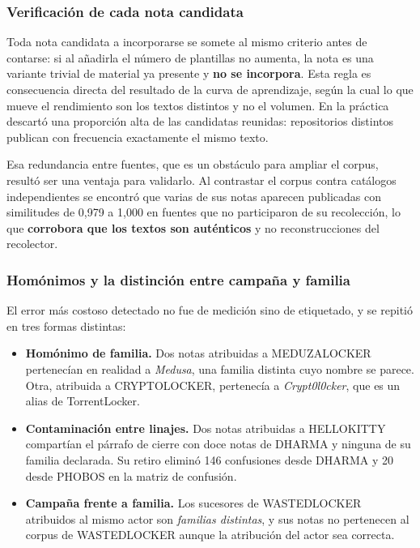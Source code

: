 \subsubsection*{Verificación de cada nota candidata}

Toda nota candidata a incorporarse se somete al mismo criterio antes de contarse: si al añadirla el número de plantillas no aumenta, la nota es una variante trivial de material ya presente y \textbf{no se incorpora}. Esta regla es consecuencia directa del resultado de la curva de aprendizaje, según la cual lo que mueve el rendimiento son los textos distintos y no el volumen. En la práctica descartó una proporción alta de las candidatas reunidas: repositorios distintos publican con frecuencia exactamente el mismo texto.

Esa redundancia entre fuentes, que es un obstáculo para ampliar el corpus, resultó ser una ventaja para validarlo. Al contrastar el corpus contra catálogos independientes se encontró que varias de sus notas aparecen publicadas con similitudes de 0,979 a 1,000 en fuentes que no participaron de su recolección, lo que \textbf{corrobora que los textos son auténticos} y no reconstrucciones del recolector.

\subsubsection*{Homónimos y la distinción entre campaña y familia}

El error más costoso detectado no fue de medición sino de etiquetado, y se repitió en tres formas distintas:

\begin{itemize}
  \item \textbf{Homónimo de familia.} Dos notas atribuidas a MEDUZALOCKER pertenecían en realidad a \textit{Medusa}, una familia distinta cuyo nombre se parece. Otra, atribuida a CRYPTOLOCKER, pertenecía a \textit{Crypt0l0cker}, que es un alias de TorrentLocker.
  \item \textbf{Contaminación entre linajes.} Dos notas atribuidas a HELLOKITTY compartían el párrafo de cierre con doce notas de DHARMA y ninguna de su familia declarada. Su retiro eliminó 146 confusiones desde DHARMA y 20 desde PHOBOS en la matriz de confusión.
  \item \textbf{Campaña frente a familia.} Los sucesores de WASTEDLOCKER atribuidos al mismo actor son \textit{familias distintas}, y sus notas no pertenecen al corpus de WASTEDLOCKER aunque la atribución del actor sea correcta.
\end{itemize}

